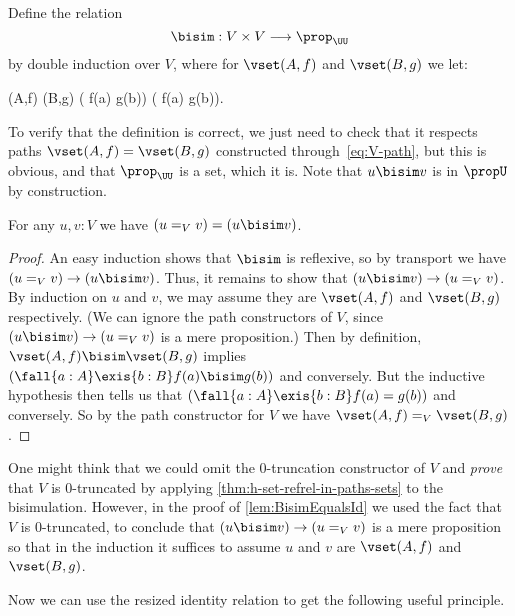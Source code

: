 \begin{defn}\label{def:bisimulation}
  Define the 
  relation
  \begin{equation*}
    \mathord\bisim : V \times V \longrightarrow \prop_{\UU}
  \end{equation*}
  by double induction over $V$, where for $\vset(A,f)$ and $\vset(B,g)$ we let:
  \begin{narrowmultline*}
    \vset(A,f)  \bisim \vset(B,g)  \narrowbreak
    \big( f(a)  \bisim g(b)\big) \land
    \big( f(a) \bisim g(b)\big).
  \end{narrowmultline*}
\end{defn}
%
To verify that the definition is correct, we just need to check that it respects paths $\vset(A, f) = \vset(B, g)$ constructed through~\eqref{eq:V-path}, but this is obvious, and that $\prop_{\UU}$ is a set, which it is.  Note that $u \bisim v$ is in $\propU$ by construction.

\begin{lem}\label{lem:BisimEqualsId}
For any $u,v:V$ we have $(u=_V v) = (u \bisim v)$.
\end{lem}

\begin{proof}
An easy induction shows that $\bisim$ is reflexive, so by transport we have $(u=_V v)\to (u \bisim v)$.
Thus, it remains to show that $(u \bisim v)\to (u=_V v)$.
By induction on $u$ and $v$, we may assume they are $\vset(A,f)$ and $\vset(B,g)$ respectively.
(We can ignore the path constructors of $V$, since $(u \bisim v)\to (u=_V v)$ is a mere proposition.)
Then by definition, $\vset(A,f)\bisim\vset(B,g)$ implies $(\fall{a:A}\exis{b:B}f(a)  \bisim g(b))$ and conversely.
But the inductive hypothesis then tells us that $(\fall{a:A}\exis{b:B}f(a) = g(b))$ and conversely.
So by the path con\-struc\-tor for $V$ we have $\vset(A,f) =_V \vset(B,g)$.
\end{proof}

One might think that we could omit the 0-truncation constructor of $V$ and \emph{prove} that $V$ is 0-truncated by applying \cref{thm:h-set-refrel-in-paths-sets} to the bisimulation.
However, in the proof of \cref{lem:BisimEqualsId} we used the fact that $V$ is 0-truncated, to conclude that $(u \bisim v)\to (u=_V v)$ is a mere proposition so that in the induction it suffices to assume $u$ and $v$ are $\vset(A,f)$ and $\vset(B,g)$.

Now we can use the resized identity relation to get the following useful principle.

